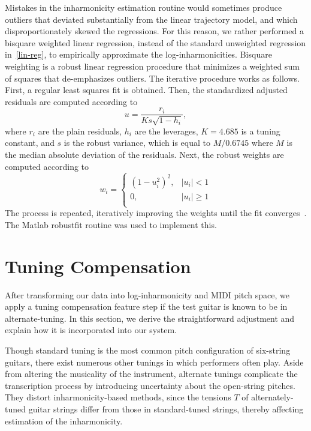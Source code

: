 \documentclass[12pt]{cmuthesis}
\begin{document}
Mistakes in the inharmonicity estimation routine would sometimes produce outliers that deviated substantially from the linear trajectory model, and which disproportionately skewed the regressions. For this reason, we rather performed a bisquare weighted linear regression, instead of the standard unweighted regression in~\eqref{lin-reg}, to empirically approximate the log-inharmonicities. Bisquare weighting is a robust linear regression procedure that minimizes a weighted sum of squares that de-emphasizes outliers. The iterative procedure works as follows. First, a regular least squares fit is obtained. Then, the standardized adjusted residuals are computed according to
\begin{equation}
u = \frac{r_i}{Ks\sqrt{1-h_i}},
\end{equation}
where $r_i$ are the plain residuals, $h_i$ are the leverages, $K = 4.685$ is a tuning constant, and $s$ is the robust variance, which is equal to $M/0.6745$ where $M$ is the median absolute deviation of the residuals. Next, the robust weights are computed according to
\begin{equation}
w_i = \begin{cases}
(1-u_i^2)^2, & |u_i| < 1\\
0, & |u_i| \geq 1\\
\end{cases}
\end{equation} 
The process is repeated, iteratively improving the weights until the fit converges~\cite{matlab}. The Matlab robustfit routine was used to implement this.

\section{Tuning Compensation}
After transforming our data into log-inharmonicity and MIDI pitch space, we apply a tuning compensation feature step if the test guitar is known to be in alternate-tuning. In this section, we derive the straightforward adjustment and explain how it is incorporated into our system. 

Though standard tuning is the most common pitch configuration of six-string guitars, there exist numerous other tunings in which performers often play. Aside from altering the musicality of the instrument, alternate tunings complicate the transcription process by introducing uncertainty about the open-string pitches. They distort inharmonicity-based methods, since the tensions $T$ of alternately-tuned guitar strings differ from those in standard-tuned strings, thereby affecting estimation of the inharmonicity. 
\end{document}
